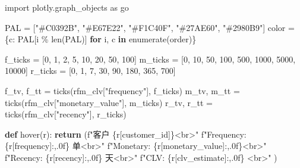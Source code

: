 \documentclass[
]{ctexart}
\newenvironment{Shaded}{\begin{snugshade}}{\end{snugshade}}
\newcommand{\BuiltInTok}[1]{\textcolor[rgb]{0.00,0.23,0.31}{#1}}
\newcommand{\ControlFlowTok}[1]{\textcolor[rgb]{0.00,0.23,0.31}{\textbf{#1}}}
\newcommand{\DecValTok}[1]{\textcolor[rgb]{0.68,0.00,0.00}{#1}}
\newcommand{\ImportTok}[1]{\textcolor[rgb]{0.00,0.46,0.62}{#1}}
\newcommand{\KeywordTok}[1]{\textcolor[rgb]{0.00,0.23,0.31}{\textbf{#1}}}
\newcommand{\NormalTok}[1]{\textcolor[rgb]{0.00,0.23,0.31}{#1}}
\newcommand{\OperatorTok}[1]{\textcolor[rgb]{0.37,0.37,0.37}{#1}}
\newcommand{\SpecialCharTok}[1]{\textcolor[rgb]{0.37,0.37,0.37}{#1}}
\newcommand{\SpecialStringTok}[1]{\textcolor[rgb]{0.13,0.47,0.30}{#1}}
\newcommand{\StringTok}[1]{\textcolor[rgb]{0.13,0.47,0.30}{#1}}
\begin{document}
\begin{Shaded}
\begin{Highlighting}[]
\ImportTok{import}\NormalTok{ plotly.graph\_objects }\ImportTok{as}\NormalTok{ go}

\NormalTok{PAL }\OperatorTok{=}\NormalTok{ [}\StringTok{"\#C0392B"}\NormalTok{, }\StringTok{"\#E67E22"}\NormalTok{, }\StringTok{"\#F1C40F"}\NormalTok{, }\StringTok{"\#27AE60"}\NormalTok{, }\StringTok{"\#2980B9"}\NormalTok{]}
\NormalTok{color }\OperatorTok{=}\NormalTok{ \{c: PAL[i }\OperatorTok{\%} \BuiltInTok{len}\NormalTok{(PAL)] }\ControlFlowTok{for}\NormalTok{ i, c }\KeywordTok{in} \BuiltInTok{enumerate}\NormalTok{(order)\}}

\NormalTok{f\_ticks }\OperatorTok{=}\NormalTok{ [}\DecValTok{0}\NormalTok{, }\DecValTok{1}\NormalTok{, }\DecValTok{2}\NormalTok{, }\DecValTok{5}\NormalTok{, }\DecValTok{10}\NormalTok{, }\DecValTok{20}\NormalTok{, }\DecValTok{50}\NormalTok{, }\DecValTok{100}\NormalTok{]}
\NormalTok{m\_ticks }\OperatorTok{=}\NormalTok{ [}\DecValTok{0}\NormalTok{, }\DecValTok{10}\NormalTok{, }\DecValTok{50}\NormalTok{, }\DecValTok{100}\NormalTok{, }\DecValTok{500}\NormalTok{, }\DecValTok{1000}\NormalTok{, }\DecValTok{5000}\NormalTok{, }\DecValTok{10000}\NormalTok{]}
\NormalTok{r\_ticks }\OperatorTok{=}\NormalTok{ [}\DecValTok{0}\NormalTok{, }\DecValTok{1}\NormalTok{, }\DecValTok{7}\NormalTok{, }\DecValTok{30}\NormalTok{, }\DecValTok{90}\NormalTok{, }\DecValTok{180}\NormalTok{, }\DecValTok{365}\NormalTok{, }\DecValTok{700}\NormalTok{]}

\NormalTok{f\_tv, f\_tt }\OperatorTok{=}\NormalTok{ ticks(rfm\_clv[}\StringTok{"frequency"}\NormalTok{], f\_ticks)}
\NormalTok{m\_tv, m\_tt }\OperatorTok{=}\NormalTok{ ticks(rfm\_clv[}\StringTok{"monetary\_value"}\NormalTok{], m\_ticks)}
\NormalTok{r\_tv, r\_tt }\OperatorTok{=}\NormalTok{ ticks(rfm\_clv[}\StringTok{"recency"}\NormalTok{], r\_ticks)}


\KeywordTok{def}\NormalTok{ hover(r):}
    \ControlFlowTok{return}\NormalTok{ (}\SpecialStringTok{f"客户 }\SpecialCharTok{\{}\NormalTok{r[}\StringTok{\textquotesingle{}customer\_id\textquotesingle{}}\NormalTok{]}\SpecialCharTok{\}}\SpecialStringTok{\textless{}br\textgreater{}"}
            \SpecialStringTok{f"Frequency: }\SpecialCharTok{\{}\NormalTok{r[}\StringTok{\textquotesingle{}frequency\textquotesingle{}}\NormalTok{]}\SpecialCharTok{:,.0f\}}\SpecialStringTok{ 单\textless{}br\textgreater{}"}
            \SpecialStringTok{f"Monetary: }\SpecialCharTok{\{}\NormalTok{r[}\StringTok{\textquotesingle{}monetary\_value\textquotesingle{}}\NormalTok{]}\SpecialCharTok{:,.0f\}}\SpecialStringTok{\textless{}br\textgreater{}"}
            \SpecialStringTok{f"Recency: }\SpecialCharTok{\{}\NormalTok{r[}\StringTok{\textquotesingle{}recency\textquotesingle{}}\NormalTok{]}\SpecialCharTok{:,.0f\}}\SpecialStringTok{ 天\textless{}br\textgreater{}"}
            \SpecialStringTok{f"CLV: }\SpecialCharTok{\{}\NormalTok{r[}\StringTok{\textquotesingle{}clv\_estimate\textquotesingle{}}\NormalTok{]}\SpecialCharTok{:,.0f\}}\SpecialStringTok{ \textless{}br\textgreater{}"}
\NormalTok{            )}


\end{Highlighting}
\end{Shaded}
\end{document}
